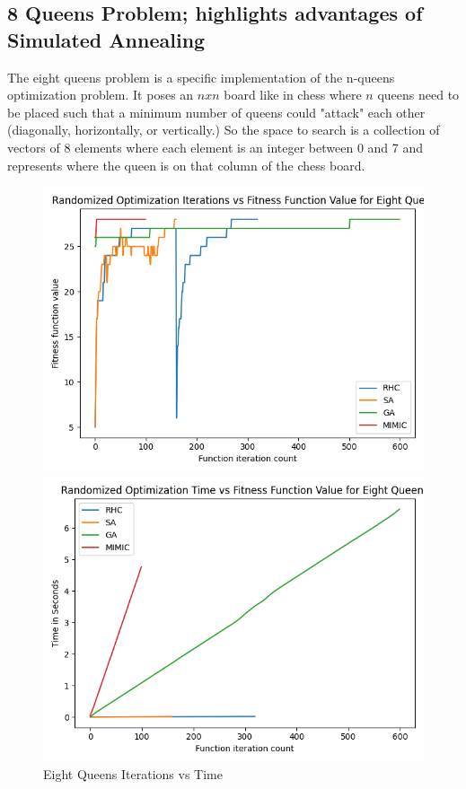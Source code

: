 \documentclass[11pt]{article}
\newcommand{\problemtwo}{8 Queens Problem}
\begin{document}
    \subsection{\problemtwo \hspace{0em}; highlights advantages of Simulated Annealing}
    The eight queens problem is a specific implementation of the n-queens optimization problem.\cite{Russel10} It poses
    an $n x n$ board like in chess where $n$ queens need to be placed such that a minimum number of queens could "attack"
    each other (diagonally, horizontally, or vertically.) So the space to search is a collection of vectors of 8 elements
    where each element is an integer between 0 and 7 and represents where the queen is on that column of the chess board.
    \begin{figure}
        \begin{minipage}{0.4\textwidth}
            \centering
            \includegraphics[width=0.9\linewidth]{eightqueens1.png}
            \caption{Eight Queens Iterations vs Fitness Function Value}\label{Fig:Eight Queens Iterations vs Fitness Function Value}
        \end{minipage}\hfill
        \begin{minipage}{0.4\textwidth}
            \centering
            \includegraphics[width=0.9\linewidth]{eightqueens2.png}
            \caption{Eight Queens Iterations vs Time}\label{Fig:Eight Queens Iterations vs Time}
        \end{minipage}
    \end{figure}
\end{document}
